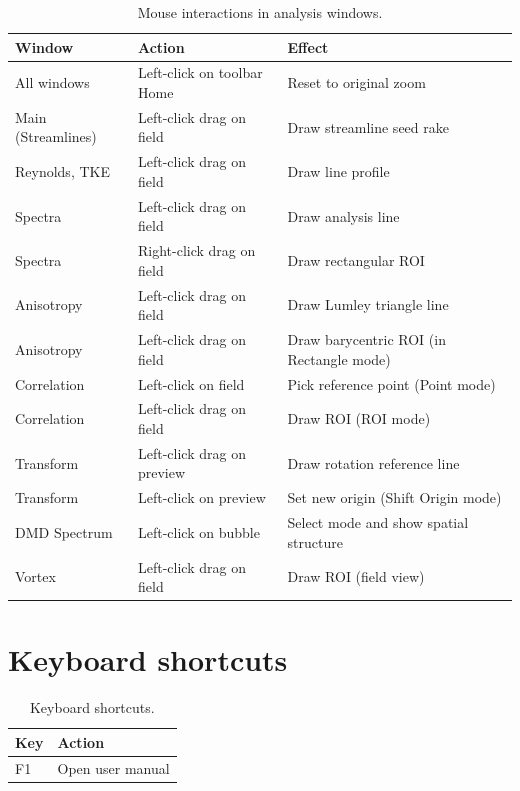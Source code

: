 \documentclass[11pt, a4paper]{report}
\begin{document}
\begin{table}[htbp]
\centering
\caption{Mouse interactions in analysis windows.}
\begin{tabular}{lp{4cm}p{6.5cm}}
\toprule
\textbf{Window} & \textbf{Action} & \textbf{Effect} \\
\midrule
All windows       & Left-click on toolbar Home & Reset to original zoom \\
Main (Streamlines) & Left-click drag on field & Draw streamline seed rake \\
Reynolds, TKE     & Left-click drag on field & Draw line profile \\
Spectra           & Left-click drag on field & Draw analysis line \\
Spectra           & Right-click drag on field & Draw rectangular ROI \\
Anisotropy        & Left-click drag on field & Draw Lumley triangle line \\
Anisotropy        & Left-click drag on field & Draw barycentric ROI (in Rectangle mode) \\
Correlation       & Left-click on field & Pick reference point (Point mode) \\
Correlation       & Left-click drag on field & Draw ROI (ROI mode) \\
Transform         & Left-click drag on preview & Draw rotation reference line \\
Transform         & Left-click on preview & Set new origin (Shift Origin mode) \\
DMD Spectrum      & Left-click on bubble & Select mode and show spatial structure \\
Vortex            & Left-click drag on field & Draw ROI (field view) \\
\bottomrule
\end{tabular}
\end{table}

\section{Keyboard shortcuts}

\begin{table}[htbp]
\centering
\caption{Keyboard shortcuts.}
\begin{tabular}{ll}
\toprule
\textbf{Key} & \textbf{Action} \\
\midrule
F1 & Open user manual \\
\bottomrule
\end{tabular}
\end{table}
\end{document}
